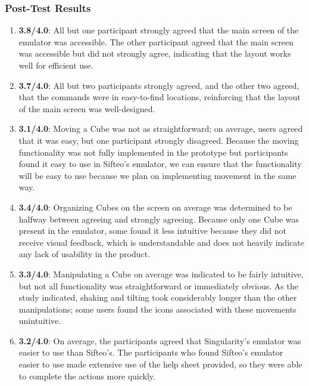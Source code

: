 \documentclass[12pt]{article}
\begin{document}
\subsubsection{Post-Test Results}
\begin{enumerate}
        \item{\textbf{3.8/4.0}: All but one participant strongly agreed that the main screen of the emulator was accessible. The other participant agreed that the main screen was accessible but did not strongly agree, indicating that the layout works well for efficient use.}
        \item{\textbf{3.7/4.0}: All but two participants strongly agreed, and the other two agreed, that the commands were in easy-to-find locations, reinforcing that the layout of the main screen was well-designed.}
        \item{\textbf{3.1/4.0}: Moving a Cube was not as straightforward; on average, users agreed that it was easy, but one participant strongly disagreed.  Because the moving functionality was not fully implemented in the prototype but participants found it easy to use in Sifteo's emulator, we can ensure that the functionality will be easy to use because we plan on implementing movement in the same way.}
        \item{\textbf{3.4/4.0}: Organizing Cubes on the screen on average was determined to be halfway between agreeing and strongly agreeing. Because only one Cube was present in the emulator, some found it less intuitive because they did not receive visual feedback, which is understandable and does not heavily indicate any lack of usability in the product.}
        \item{\textbf{3.3/4.0}: Manipulating a Cube on average was indicated to be fairly intuitive, but not all functionality was straightforward or immediately obvious.  As the study indicated, shaking and tilting took considerably longer than the other manipulations; some users found the icons associated with these movements unintuitive.}
        \item{\textbf{3.2/4.0}: On average, the participants agreed that Singularity's emulator was easier to use than Sifteo's.  The participants who found Sifteo's emulator easier to use made extensive use of the help sheet provided, so they were able to complete the actions more quickly.}
\end{enumerate}
\end{document}
